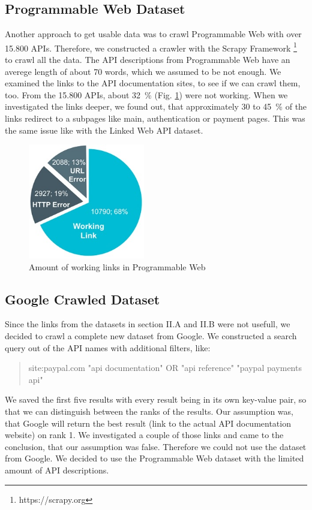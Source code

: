 \documentclass[a4paper]{IEEEtran}
\begin{document}
\subsection{Programmable Web Dataset}
Another approach to get usable data was to crawl Programmable Web with over 15.800 APIs. Therefore, we constructed a crawler with the Scrapy Framework \footnote[2]{https://scrapy.org} to crawl all the data. The API descriptions from Programmable Web have an averege length of about 70 words, which we assumed to be not enough. We examined the links to the API documentation sites, to see if we can crawl them, too. From the 15.800 APIs, about 32~\% (Fig.  \ref{fig_sim3}) were not working. When we investigated the links deeper, we found out, that approximately 30 to 45~\% of the links redirect to a subpages like  main, authentication or payment pages. This was the same issue like with the Linked Web API dataset.
\begin{figure}[h]
\centering
\includegraphics[width= 2in]{img/pie.png}
\caption{Amount of working links in Programmable Web}
\label{fig_sim3}
\end{figure}

\subsection{Google Crawled Dataset}
Since the links from the datasets in section II.A and II.B were not usefull, we decided to crawl a complete new dataset from Google. We constructed a search query out of the API names with additional filters, like:\\

\begin{quote}
site:paypal.com "api documentation" OR "api reference" "paypal payments api"\\
\end{quote}

We saved the first five results with every result being in its own key-value pair, so that we can distinguish between the ranks of the results. Our assumption was, that Google will return the best result (link to the actual API documentation website) on rank 1. We investigated a couple of those links and came to the conclusion, that our assumption was false. Therefore we could not use the dataset from Google.
We decided to use the Programmable Web dataset with the limited amount of API descriptions.
\end{document}
